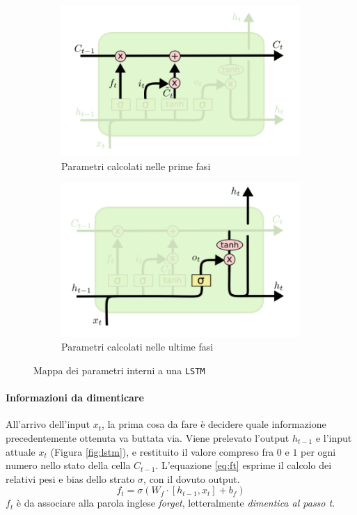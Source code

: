 \documentclass[twoside,twocolumn,10pt]{extarticle}
\theoremstyle{definition}
\begin{document}
		\begin{figure}[h]
			\centering
			\begin{subfigure}[b]{.496\textwidth}
				\includegraphics[width=\textwidth]{img/inside-lstm.png}
				\caption{Parametri calcolati nelle prime fasi}
			\end{subfigure}
			\begin{subfigure}[b]{.496\textwidth}
				\includegraphics[width=\textwidth]{img/inside-lstm2.png}
				\caption{Parametri calcolati nelle ultime fasi}
			\end{subfigure}
			\caption{Mappa dei parametri interni a una \texttt{LSTM}}
			\label{fig:parmap}
		\end{figure}
		
		\paragraph{Informazioni da dimenticare}
			All'arrivo dell'input $x_t$, la prima cosa da fare è decidere quale informazione precedentemente ottenuta va buttata via. Viene prelevato l'output $h_{t - 1}$ e l'input attuale $x_t$ (Figura \ref{fig:lstm}), e restituito il valore compreso fra $0$ e $1$ per ogni numero nello stato della cella $C_{t - 1}$. L'equazione \ref{eq:ft} esprime il calcolo dei relativi pesi e bias dello strato $\sigma$, con il dovuto output.
			\begin{equation}\label{eq:ft}
				f_t = \sigma(W_f \cdot [h_{t - 1}, x_t] + b_f)
			\end{equation}
			$f_t$ è da associare alla parola inglese \textit{forget}, letteralmente \textit{dimentica al passo t}.
		
\end{document}
